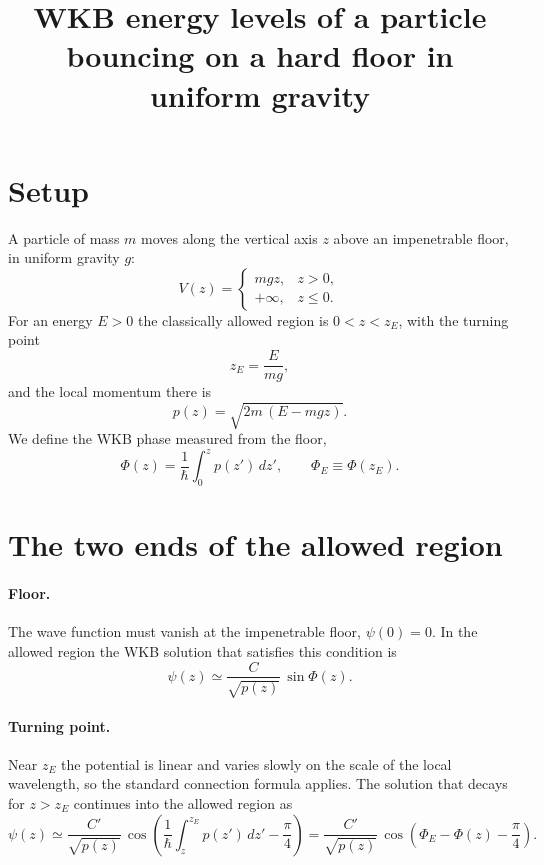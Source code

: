\documentclass{article}
\title{WKB energy levels of a particle bouncing on a hard floor in uniform gravity}
\date{}
\begin{document}
\maketitle

\section{Setup}
A particle of mass $m$ moves along the vertical axis $z$ above an impenetrable floor, in uniform gravity $g$:
\begin{equation}
  V(z) = \begin{cases} mgz, & z > 0, \\ +\infty, & z \le 0 . \end{cases}
  \label{eq:potential}
\end{equation}
For an energy $E > 0$ the classically allowed region is $0 < z < z_E$, with the turning point
\begin{equation}
  z_E = \frac{E}{mg} ,
  \label{eq:turning}
\end{equation}
and the local momentum there is
\begin{equation}
  p(z) = \sqrt{2m\,(E - mgz)} .
  \label{eq:momentum}
\end{equation}
We define the WKB phase measured from the floor,
\begin{equation}
  \Phi(z) = \frac{1}{\hbar}\int_0^z p(z')\,dz', \qquad \Phi_E \equiv \Phi(z_E) .
  \label{eq:phase}
\end{equation}

\section{The two ends of the allowed region}
\paragraph{Floor.} The wave function must vanish at the impenetrable floor, $\psi(0) = 0$. In the allowed region the WKB solution that satisfies this condition is
\begin{equation}
  \psi(z) \simeq \frac{C}{\sqrt{p(z)}}\,\sin\Phi(z) .
  \label{eq:floor}
\end{equation}

\paragraph{Turning point.} Near $z_E$ the potential is linear and varies slowly on the scale of the local wavelength, so the standard connection formula applies. The solution that decays for $z > z_E$ continues into the allowed region as
\begin{equation}
  \psi(z) \simeq \frac{C'}{\sqrt{p(z)}}\,\cos\!\left(\frac{1}{\hbar}\int_z^{z_E} p(z')\,dz' - \frac{\pi}{4}\right) = \frac{C'}{\sqrt{p(z)}}\,\cos\!\left(\Phi_E - \Phi(z) - \frac{\pi}{4}\right) .
  \label{eq:connection}
\end{equation}
\end{document}
